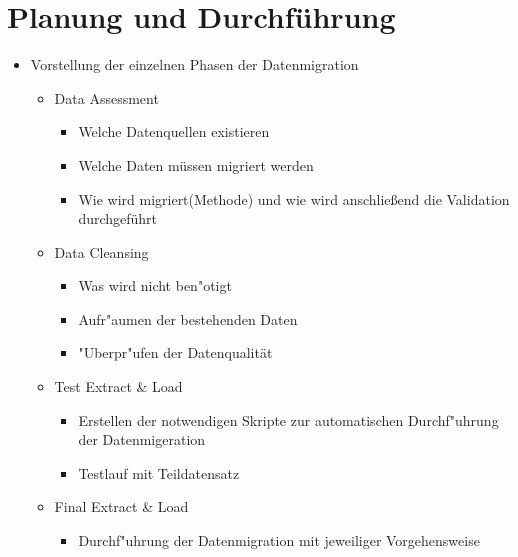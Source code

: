 \documentclass[11pt]{scrartcl}
\begin{document}
\section{Planung und Durchführung}

\begin{itemize}
	\item Vorstellung der einzelnen Phasen der Datenmigration
	\begin{itemize}
		\item Data Assessment
		\begin{itemize}
			\item Welche Datenquellen existieren
			\item Welche Daten müssen migriert werden
			\item Wie wird migriert(Methode) und wie wird anschließend die Validation durchgeführt
		\end{itemize}
		
		\item Data Cleansing
		\begin{itemize}
			\item Was wird nicht ben"otigt
			\item Aufr"aumen der bestehenden Daten
			\item "Uberpr"ufen der Datenqualität
		\end{itemize}
		
		\item Test Extract \& Load
		\begin{itemize}
			\item Erstellen der notwendigen Skripte zur automatischen Durchf"uhrung der Datenmigeration 
			\item Testlauf mit Teildatensatz
		\end{itemize}
		
		\item Final Extract \& Load
		\begin{itemize}
			\item Durchf"uhrung der Datenmigration mit jeweiliger Vorgehensweise
		\end{itemize}
		

\end{itemize}
\end{itemize}
\end{document}
